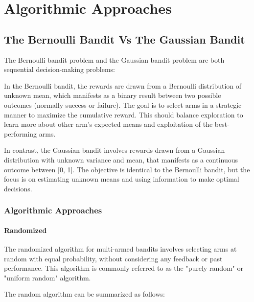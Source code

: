 \chapter{Algorithmic Approaches}
\label{cha:algorithmic} %

\section{The Bernoulli Bandit Vs The Gaussian Bandit}
\label{sec:BernoulliBandit}

The Bernoulli bandit problem and the Gaussian bandit problem are both sequential decision-making problems:

In the Bernoulli bandit, the rewards are drawn from a Bernoulli distribution of unknown mean, which manifests as a binary result between two possible outcomes (normally success or failure). The goal is to select arms in a strategic manner to maximize the cumulative reward. This should balance exploration to learn more about other arm's expected means and exploitation of the best-performing arms.

In contrast, the Gaussian bandit involves rewards drawn from a Gaussian distribution with unknown variance and mean, that manifests as a continuous outcome between [0, 1]. The objective is identical to the Bernoulli bandit, but the focus is on estimating unknown means and using information to make optimal decisions.

\subsection{Algorithmic Approaches}
\label{sec:Algorithms}

\subsubsection{Randomized}
\label{sec:randomized}
The randomized algorithm for multi-armed bandits involves selecting arms at random with equal probability, without considering any feedback or past performance. This algorithm is commonly referred to as the "purely random" or "uniform random" algorithm.

The random algorithm can be summarized as follows:



